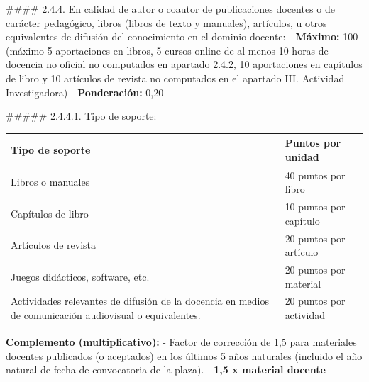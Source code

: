 \documentclass{article}
\begin{document}
\begin{itemize}
\begin{itemize}
\begin{scriptsize}
                  \#\#\#\# 2.4.4. En calidad de autor o coautor de publicaciones docentes o de carácter pedagógico, libros (libros de texto y manuales), artículos, u otros equivalentes de difusión del conocimiento en el dominio docente:
                  - \textbf{Máximo:} 100 (máximo 5 aportaciones en libros, 5 cursos online de al menos 10 horas de docencia no oficial no computados en apartado 2.4.2, 10 aportaciones en capítulos de libro y 10 artículos de revista no computados en el apartado III. Actividad Investigadora)
                  - \textbf{Ponderación:} 0,20

                  \#\#\#\#\# 2.4.4.1. Tipo de soporte:
                  \vspace{0.4cm}
                  \begin{table}[h!]\centering\renewcommand{\arraystretch}{1.3}
                    \begin{tabular}{|p{}|p{}|}\hline
                      Tipo de soporte                                                                                         & Puntos por unidad       \\\hline
                      Libros o manuales                                                                                       & 40 puntos por libro     \\\hline
                      Capítulos de libro                                                                                      & 10 puntos por capítulo  \\\hline
                      Artículos de revista                                                                                    & 20 puntos por artículo  \\\hline
                      Juegos didácticos, software, etc.                                                                       & 20 puntos por material  \\\hline
                      Actividades relevantes de difusión de la docencia en medios de comunicación audiovisual o equivalentes. & 20 puntos por actividad \\\hline
                    \end{tabular}\end{table}
                  \vspace{0.4cm}

                  \textbf{Complemento (multiplicativo):}
                  - Factor de corrección de 1,5 para materiales docentes publicados (o aceptados) en los últimos 5 años naturales (incluido el año natural de fecha de convocatoria de la plaza).
                  - \textbf{1,5 x material docente}


\end{scriptsize}
\end{itemize}
\end{itemize}
\end{document}
